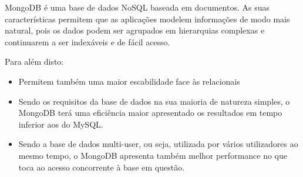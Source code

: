    MongoDB é uma base de dados NoSQL baseada em documentos. As suas características permitem que as aplicações modelem informações de modo mais natural, pois os dados podem ser agrupados em hierarquias complexas e continuarem a ser indexáveis e de fácil acesso.
   \par Para além disto:
    
    \begin{itemize}
        \item Permitem também uma maior escabilidade face às relacionais
        \item Sendo os requisitos da base de dados na sua maioria de natureza simples, o MongoDB terá uma eficiência maior apresentado os resultados em tempo inferior aos do MySQL.
        \item Sendo a base de dados multi-user, ou seja, utilizada por vários utilizadores ao mesmo tempo, o MongoDB apresenta também melhor performance no que toca ao acesso concorrente à base em questão.
    \end{itemize}